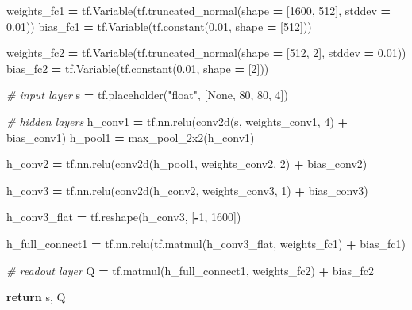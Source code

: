 \documentclass[]{article}
\newenvironment{Shaded}{\begin{snugshade}}{\end{snugshade}}
\newcommand{\DecValTok}[1]{\textcolor[rgb]{0.00,0.00,0.81}{#1}}
\newcommand{\FloatTok}[1]{\textcolor[rgb]{0.00,0.00,0.81}{#1}}
\newcommand{\StringTok}[1]{\textcolor[rgb]{0.31,0.60,0.02}{#1}}
\newcommand{\CommentTok}[1]{\textcolor[rgb]{0.56,0.35,0.01}{\textit{#1}}}
\newcommand{\VariableTok}[1]{\textcolor[rgb]{0.00,0.00,0.00}{#1}}
\newcommand{\ControlFlowTok}[1]{\textcolor[rgb]{0.13,0.29,0.53}{\textbf{#1}}}
\newcommand{\OperatorTok}[1]{\textcolor[rgb]{0.81,0.36,0.00}{\textbf{#1}}}
\newcommand{\NormalTok}[1]{#1}
\begin{document}
\begin{Shaded}
\begin{Highlighting}[]
\NormalTok{    weights_fc1 }\OperatorTok{=}\NormalTok{ tf.Variable(tf.truncated_normal(shape }\OperatorTok{=}\NormalTok{ [}\DecValTok{1600}\NormalTok{, }\DecValTok{512}\NormalTok{], stddev }\OperatorTok{=} \FloatTok{0.01}\NormalTok{))}
\NormalTok{    bias_fc1 }\OperatorTok{=}\NormalTok{ tf.Variable(tf.constant(}\FloatTok{0.01}\NormalTok{, shape }\OperatorTok{=}\NormalTok{ [}\DecValTok{512}\NormalTok{]))}

\NormalTok{    weights_fc2 }\OperatorTok{=}\NormalTok{ tf.Variable(tf.truncated_normal(shape }\OperatorTok{=}\NormalTok{ [}\DecValTok{512}\NormalTok{, }\DecValTok{2}\NormalTok{], stddev }\OperatorTok{=} \FloatTok{0.01}\NormalTok{))}
\NormalTok{    bias_fc2 }\OperatorTok{=}\NormalTok{ tf.Variable(tf.constant(}\FloatTok{0.01}\NormalTok{, shape }\OperatorTok{=}\NormalTok{ [}\DecValTok{2}\NormalTok{]))}

    \CommentTok{# input layer}
\NormalTok{    s }\OperatorTok{=}\NormalTok{ tf.placeholder(}\StringTok{"float"}\NormalTok{, [}\VariableTok{None}\NormalTok{, }\DecValTok{80}\NormalTok{, }\DecValTok{80}\NormalTok{, }\DecValTok{4}\NormalTok{])}

    \CommentTok{# hidden layers}
\NormalTok{    h_conv1 }\OperatorTok{=}\NormalTok{ tf.nn.relu(conv2d(s, weights_conv1, }\DecValTok{4}\NormalTok{) }\OperatorTok{+}\NormalTok{ bias_conv1)}
\NormalTok{    h_pool1 }\OperatorTok{=}\NormalTok{ max_pool_2x2(h_conv1)}

\NormalTok{    h_conv2 }\OperatorTok{=}\NormalTok{ tf.nn.relu(conv2d(h_pool1, weights_conv2, }\DecValTok{2}\NormalTok{) }\OperatorTok{+}\NormalTok{ bias_conv2)}

\NormalTok{    h_conv3 }\OperatorTok{=}\NormalTok{ tf.nn.relu(conv2d(h_conv2, weights_conv3, }\DecValTok{1}\NormalTok{) }\OperatorTok{+}\NormalTok{ bias_conv3)}

\NormalTok{    h_conv3_flat }\OperatorTok{=}\NormalTok{ tf.reshape(h_conv3, [}\OperatorTok{-}\DecValTok{1}\NormalTok{, }\DecValTok{1600}\NormalTok{])}

\NormalTok{    h_full_connect1 }\OperatorTok{=}\NormalTok{ tf.nn.relu(tf.matmul(h_conv3_flat, weights_fc1) }\OperatorTok{+}\NormalTok{ bias_fc1)}

    \CommentTok{# readout layer}
\NormalTok{    Q }\OperatorTok{=}\NormalTok{ tf.matmul(h_full_connect1, weights_fc2) }\OperatorTok{+}\NormalTok{ bias_fc2}

    \ControlFlowTok{return}\NormalTok{ s, Q}
\end{Highlighting}
\end{Shaded}
\end{document}
